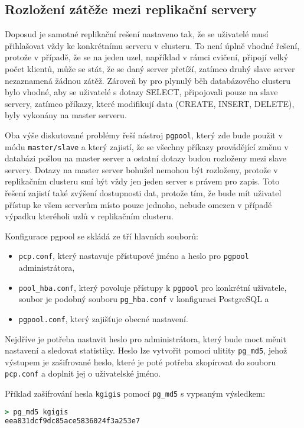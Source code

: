 \subsection{Rozložení zátěže mezi replikační servery}

Doposud je samotné replikační rešení nastaveno tak, že se uživatelé musí přihlašovat vždy ke konkrétnímu serveru v clusteru. To není úplně vhodné řešení, protože v případě, že se na jeden uzel, například v rámci cvičení, připojí velký počet klientů, může se stát, že se daný server přetíží, zatímco druhý slave server nezaznamená žádnou zátěž. Zároveň by pro plynulý běh databázového clusteru bylo vhodné, aby se uživatelé s dotazy SELECT, připojovali pouze na slave servery, zatímco příkazy, které modifikují data (CREATE, INSERT, DELETE), byly vykonány na master serveru. 

Oba výše diskutované problémy řeší nástroj \texttt{pgpool}, který zde bude použit v módu \texttt{master/slave} a který zajistí, že se všechny příkazy provádějící změnu v databázi pošlou na master server a ostatní dotazy budou rozloženy mezi slave servery. Dotazy na master server bohužel nemohou být rozloženy, protože v replikačním clusteru smí být vždy jen jeden server s právem pro zapis. Toto řešení zajistí také zvýšení dostupnosti dat, protože tím, že bude mít uživatel přístup ke všem serverům místo pouze jednoho, nebude omezen v případě výpadku kteréholi uzlů v replikačním clusteru.

    Konfigurace pgpool se skládá ze tří hlavních souborů:
\begin{itemize}
  \item \texttt{pcp.conf}, který nastavuje přístupové jméno a heslo pro \texttt{pgpool} administrátora, 
  \item \texttt{pool\_hba.conf}, který povoluje přístupy k \texttt{pgpool} pro konkrétní uživatele, soubor je podobný souboru \texttt{pg\_hba.conf} v konfiguraci PostgreSQL a 
  \item \texttt{pgpool.conf}, který zajišťuje obecné nastavení. 
\end{itemize}

Nejdříve je potřeba nastavit heslo pro administrátora, který bude moct měnit nastavení a sledovat statistiky. Heslo lze vytvořit pomocí ulitity \texttt{pg\_md5}, jehož výstupem je zašifrované heslo, které je poté potřeba zkopírovat do souboru \texttt{pcp.conf} a doplnit jej o uživatelské jméno.

Příklad zašifrování hesla \texttt{kgigis} pomocí \texttt{pg\_md5} s vypsaným výsledkem:
\begin{lstlisting}[language=ruby,morekeywords={pg_md5}]
> pg_md5 kgigis
eea831dcf9dc85ace5836024f3a253e7
\end{lstlisting}

